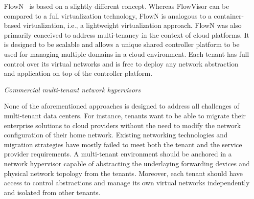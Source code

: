 FlowN~\cite{drutskoy2012,drutskoy2013} is based on a slightly different concept. Whereas FlowVisor can be compared to a full virtualization technology, FlowN 
is analogous to a container-based virtualization, i.e., a lightweight virtualization approach. FlowN 
was also primarily conceived to address multi-tenancy in the context of cloud platforms. It is designed to 
be scalable and allows a unique shared controller platform to be used for managing multiple domains 
in a cloud environment. Each tenant has full control over its virtual networks and is free to deploy 
any network abstraction and application on top of the controller platform.


\vspace{2mm}
\noindent \textit{Commercial multi-tenant network hypervisors}

None of the aforementioned approaches is designed to address all challenges of multi-tenant 
data centers. For instance, tenants want to be able to migrate their enterprise solutions to cloud 
providers without the need to modify the network configuration of their home network. Existing 
networking technologies and migration strategies have mostly failed to meet both the tenant and the 
service provider requirements.
A multi-tenant environment should be anchored in a network hypervisor capable of abstracting the 
underlaying forwarding devices and physical network topology from the tenants. Moreover, each tenant 
should have access to control abstractions and manage its own virtual networks independently and 
isolated from other tenants.

